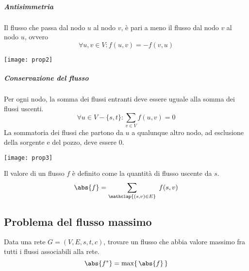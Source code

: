 \bigskip
\begin{minipage}{.5\linewidth}
	\subparagraph{Antisimmetria}
	Il flusso che passa dal nodo \(u\) al nodo \(v\), è pari a meno il flusso dal nodo \(v\) al nodo \(u\), ovvero
	\begin{equation*}
	\forall u,v \in V: f(u,v) = -f(v,u)
	\end{equation*}
\end{minipage}
\begin{minipage}{.5\linewidth}
\centering
\texttt{[image: prop2]}
\end{minipage}

\bigskip
\begin{minipage}{.5\linewidth}
	\subparagraph{Conservazione del flusso}

	Per ogni nodo, la somma dei flussi entranti deve essere uguale alla somma dei flussi uscenti.
	\begin{equation*}
	\forall u \in V - \{s, t\} \colon \sum_{v \in V} f(u, v) = 0
	\end{equation*}
	La sommatoria dei flussi che partono da \(u\) a qualunque altro nodo, ad esclusione della sorgente e del pozzo, deve essere 0.
\end{minipage}
\begin{minipage}{.5\linewidth}
\centering
\texttt{[image: prop3]}
\end{minipage}

\begin{definition}
Il valore di un flusso \(f\) è definito come la quantità di flusso uscente da \(s\).
\begin{equation*}
\abs{f} = \sum_{\mathclap{(s,v) \in E}}\; f (s,v)
\end{equation*}
\end{definition}

\subsection{Problema del flusso massimo}

\begin{definition}
Data una rete \(G = (V, E, s, t, c)\), trovare un flusso che abbia valore massimo fra tutti i flussi associabili alla rete.
\begin{equation*}
\abs{f^{*}} = \max\{\, \abs{f}\, \}
\end{equation*}
\end{definition}

